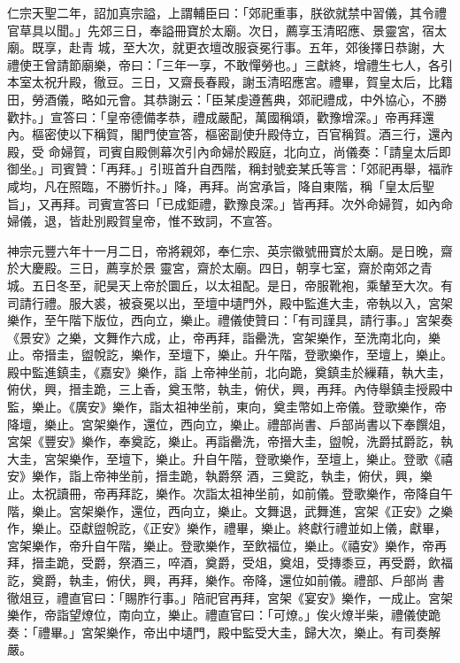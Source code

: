 \begin{pinyinscope}
 仁宗天聖二年，詔加真宗謚，上謂輔臣曰：「郊祀重事，朕欲就禁中習儀，其令禮官草具以聞。」先郊三日，奉謚冊寶於太廟。次日，薦享玉清昭應、景靈宮，宿太廟。既享，赴青
 城，至大次，就更衣壇改服袞冕行事。五年，郊後擇日恭謝，大禮使王曾請節廟樂，帝曰：「三年一享，不敢憚勞也。」三獻終，增禮生七人，各引本室太祝升殿，徹豆。三日，又齋長春殿，謝玉清昭應宮。禮畢，賀皇太后，比籍田，勞酒儀，略如元會。其恭謝云：「臣某虔遵舊典，郊祀禮成，中外協心，不勝歡抃。」宣答曰：「皇帝德備孝恭，禮成嚴配，萬國稱頌，歡豫增深。」帝再拜還內。樞密使以下稱賀，閣門使宣答，樞密副使升殿侍立，百官稱賀。酒三行，還內殿，受
 命婦賀，司賓自殿側幕次引內命婦於殿庭，北向立，尚儀奏：「請皇太后即御坐。」司賓贊：「再拜。」引班首升自西階，稱封號妾某氏等言：「郊祀再舉，福祚咸均，凡在照臨，不勝忻抃。」降，再拜。尚宮承旨，降自東階，稱「皇太后聖旨」，又再拜。司賓宣答曰「已成鉅禮，歡豫良深。」皆再拜。次外命婦賀，如內命婦儀，退，皆赴別殿賀皇帝，惟不致詞，不宣答。



 神宗元豐六年十一月二日，帝將親郊，奉仁宗、英宗徽號冊寶於太廟。是日晚，齋於大慶殿。三日，薦享於景
 靈宮，齋於太廟。四日，朝享七室，齋於南郊之青城。五日冬至，祀昊天上帝於圜丘，以太祖配。是日，帝服靴袍，乘輦至大次。有司請行禮。服大裘，被袞冕以出，至壇中壝門外，殿中監進大圭，帝執以入，宮架樂作，至午階下版位，西向立，樂止。禮儀使贊曰：「有司謹具，請行事。」宮架奏《景安》之樂，文舞作六成，止，帝再拜，詣罍洗，宮架樂作，至洗南北向，樂止。帝搢圭，盥帨訖，樂作，至壇下，樂止。升午階，登歌樂作，至壇上，樂止。殿中監進鎮圭，《嘉安》樂作，詣
 上帝神坐前，北向跪，奠鎮圭於繅藉，執大圭，俯伏，興，搢圭跪，三上香，奠玉幣，執圭，俯伏，興，再拜。內侍舉鎮圭授殿中監，樂止。《廣安》樂作，詣太祖神坐前，東向，奠圭幣如上帝儀。登歌樂作，帝降壇，樂止。宮架樂作，還位，西向立，樂止。禮部尚書、戶部尚書以下奉饌俎，宮架《豐安》樂作，奉奠訖，樂止。再詣罍洗，帝搢大圭，盥帨，洗爵拭爵訖，執大圭，宮架樂作，至壇下，樂止。升自午階，登歌樂作，至壇上，樂止。登歌《禧安》樂作，詣上帝神坐前，搢圭跪，執爵祭
 酒，三奠訖，執圭，俯伏，興，樂止。太祝讀冊，帝再拜訖，樂作。次詣太祖神坐前，如前儀。登歌樂作，帝降自午階，樂止。宮架樂作，還位，西向立，樂止。文舞退，武舞進，宮架《正安》之樂作，樂止。亞獻盥帨訖，《正安》樂作，禮畢，樂止。終獻行禮並如上儀，獻畢，宮架樂作，帝升自午階，樂止。登歌樂作，至飲福位，樂止。《禧安》樂作，帝再拜，搢圭跪，受爵，祭酒三，啐酒，奠爵，受俎，奠俎，受摶黍豆，再受爵，飲福訖，奠爵，執圭，俯伏，興，再拜，樂作。帝降，還位如前儀。禮部、戶部尚
 書徹俎豆，禮直官曰：「賜胙行事。」陪祀官再拜，宮架《宴安》樂作，一成止。宮架樂作，帝詣望燎位，南向立，樂止。禮直官曰：「可燎。」俟火燎半柴，禮儀使跪奏：「禮畢。」宮架樂作，帝出中壝門，殿中監受大圭，歸大次，樂止。有司奏解嚴。




\end{pinyinscope}
